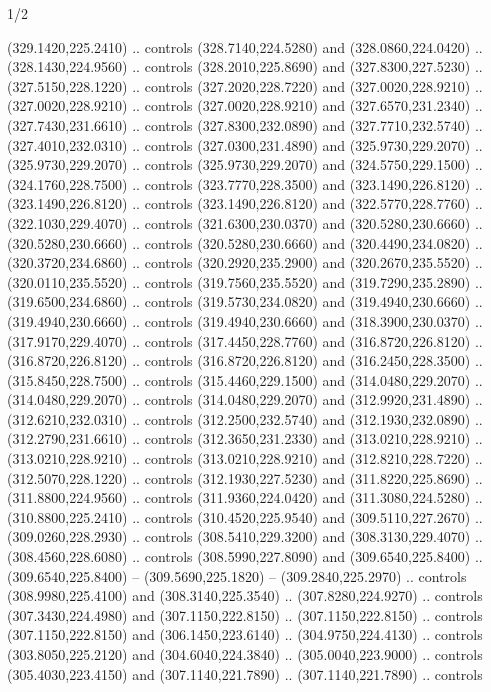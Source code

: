 \begin{flagdescription}{1/2}
\begin{scope}[xshift=0.5\flaglength]
\begin{scope}[scale=0.004\flagwidth,xshift=-90mm,yshift=89mm]
\begin{scope}[y=0.80pt, x=0.80pt, yscale=-1, xscale=1, inner sep=0pt, outer sep=0pt]
  (329.1420,225.2410) .. controls (328.7140,224.5280) and (328.0860,224.0420) ..
  (328.1430,224.9560) .. controls (328.2010,225.8690) and (327.8300,227.5230) ..
  (327.5150,228.1220) .. controls (327.2020,228.7220) and (327.0020,228.9210) ..
  (327.0020,228.9210) .. controls (327.0020,228.9210) and (327.6570,231.2340) ..
  (327.7430,231.6610) .. controls (327.8300,232.0890) and (327.7710,232.5740) ..
  (327.4010,232.0310) .. controls (327.0300,231.4890) and (325.9730,229.2070) ..
  (325.9730,229.2070) .. controls (325.9730,229.2070) and (324.5750,229.1500) ..
  (324.1760,228.7500) .. controls (323.7770,228.3500) and (323.1490,226.8120) ..
  (323.1490,226.8120) .. controls (323.1490,226.8120) and (322.5770,228.7760) ..
  (322.1030,229.4070) .. controls (321.6300,230.0370) and (320.5280,230.6660) ..
  (320.5280,230.6660) .. controls (320.5280,230.6660) and (320.4490,234.0820) ..
  (320.3720,234.6860) .. controls (320.2920,235.2900) and (320.2670,235.5520) ..
  (320.0110,235.5520) .. controls (319.7560,235.5520) and (319.7290,235.2890) ..
  (319.6500,234.6860) .. controls (319.5730,234.0820) and (319.4940,230.6660) ..
  (319.4940,230.6660) .. controls (319.4940,230.6660) and (318.3900,230.0370) ..
  (317.9170,229.4070) .. controls (317.4450,228.7760) and (316.8720,226.8120) ..
  (316.8720,226.8120) .. controls (316.8720,226.8120) and (316.2450,228.3500) ..
  (315.8450,228.7500) .. controls (315.4460,229.1500) and (314.0480,229.2070) ..
  (314.0480,229.2070) .. controls (314.0480,229.2070) and (312.9920,231.4890) ..
  (312.6210,232.0310) .. controls (312.2500,232.5740) and (312.1930,232.0890) ..
  (312.2790,231.6610) .. controls (312.3650,231.2330) and (313.0210,228.9210) ..
  (313.0210,228.9210) .. controls (313.0210,228.9210) and (312.8210,228.7220) ..
  (312.5070,228.1220) .. controls (312.1930,227.5230) and (311.8220,225.8690) ..
  (311.8800,224.9560) .. controls (311.9360,224.0420) and (311.3080,224.5280) ..
  (310.8800,225.2410) .. controls (310.4520,225.9540) and (309.5110,227.2670) ..
  (309.0260,228.2930) .. controls (308.5410,229.3200) and (308.3130,229.4070) ..
  (308.4560,228.6080) .. controls (308.5990,227.8090) and (309.6540,225.8400) ..
  (309.6540,225.8400) -- (309.5690,225.1820) -- (309.2840,225.2970) .. controls
  (308.9980,225.4100) and (308.3140,225.3540) .. (307.8280,224.9270) .. controls
  (307.3430,224.4980) and (307.1150,222.8150) .. (307.1150,222.8150) .. controls
  (307.1150,222.8150) and (306.1450,223.6140) .. (304.9750,224.4130) .. controls
  (303.8050,225.2120) and (304.6040,224.3840) .. (305.0040,223.9000) .. controls
  (305.4030,223.4150) and (307.1140,221.7890) .. (307.1140,221.7890) .. controls

\end{scope}
\end{scope}
\end{scope}
\end{flagdescription}
